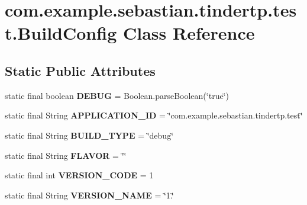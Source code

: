 \hypertarget{classcom_1_1example_1_1sebastian_1_1tindertp_1_1test_1_1BuildConfig}{}\section{com.\+example.\+sebastian.\+tindertp.\+test.\+Build\+Config Class Reference}
\label{classcom_1_1example_1_1sebastian_1_1tindertp_1_1test_1_1BuildConfig}
\subsection*{Static Public Attributes}
\begin{DoxyCompactItemize}
\item 
static final boolean {\bfseries D\+E\+B\+UG} = Boolean.\+parse\+Boolean(\char`\"{}true\char`\"{})\hypertarget{classcom_1_1example_1_1sebastian_1_1tindertp_1_1test_1_1BuildConfig_a3fb7e24fd79183ebeb5d6fbbe1767a8d}{}\label{classcom_1_1example_1_1sebastian_1_1tindertp_1_1test_1_1BuildConfig_a3fb7e24fd79183ebeb5d6fbbe1767a8d}

\item 
static final String {\bfseries A\+P\+P\+L\+I\+C\+A\+T\+I\+O\+N\+\_\+\+ID} = \char`\"{}com.\+example.\+sebastian.\+tindertp.\+test\char`\"{}\hypertarget{classcom_1_1example_1_1sebastian_1_1tindertp_1_1test_1_1BuildConfig_a4f1c01eda244ffc1a8ad2c0a122da3c3}{}\label{classcom_1_1example_1_1sebastian_1_1tindertp_1_1test_1_1BuildConfig_a4f1c01eda244ffc1a8ad2c0a122da3c3}

\item 
static final String {\bfseries B\+U\+I\+L\+D\+\_\+\+T\+Y\+PE} = \char`\"{}debug\char`\"{}\hypertarget{classcom_1_1example_1_1sebastian_1_1tindertp_1_1test_1_1BuildConfig_af60884ef13edc014e55d40ce5a1a5ff2}{}\label{classcom_1_1example_1_1sebastian_1_1tindertp_1_1test_1_1BuildConfig_af60884ef13edc014e55d40ce5a1a5ff2}

\item 
static final String {\bfseries F\+L\+A\+V\+OR} = \char`\"{}\char`\"{}\hypertarget{classcom_1_1example_1_1sebastian_1_1tindertp_1_1test_1_1BuildConfig_ac3ba143b7200ef89894bea9d054ba717}{}\label{classcom_1_1example_1_1sebastian_1_1tindertp_1_1test_1_1BuildConfig_ac3ba143b7200ef89894bea9d054ba717}

\item 
static final int {\bfseries V\+E\+R\+S\+I\+O\+N\+\_\+\+C\+O\+DE} = 1\hypertarget{classcom_1_1example_1_1sebastian_1_1tindertp_1_1test_1_1BuildConfig_ab1cd2edaa74c705bd34c2b97375c8b79}{}\label{classcom_1_1example_1_1sebastian_1_1tindertp_1_1test_1_1BuildConfig_ab1cd2edaa74c705bd34c2b97375c8b79}

\item 
static final String {\bfseries V\+E\+R\+S\+I\+O\+N\+\_\+\+N\+A\+ME} = \char`\"{}1.\char`\"{}\hypertarget{classcom_1_1example_1_1sebastian_1_1tindertp_1_1test_1_1BuildConfig_a71cd1e045423cad89764043ba0fc8773}{}\label{classcom_1_1example_1_1sebastian_1_1tindertp_1_1test_1_1BuildConfig_a71cd1e045423cad89764043ba0fc8773}

\end{DoxyCompactItemize}


